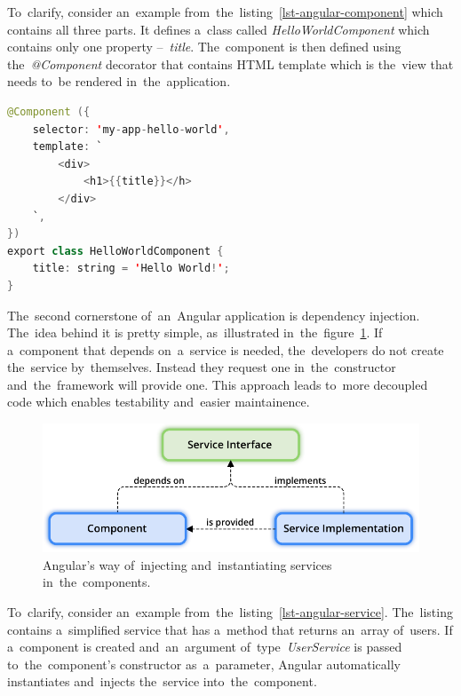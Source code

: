 To~clarify, consider an~example from~the~listing~\ref{lst-angular-component}
which contains all three parts. It defines a~class called
\textit{HelloWorldComponent} which contains only one property --~\textit{title}.
The~component is then defined using the~\textit{@Component} decorator that
contains HTML template which is the~view that needs to~be rendered
in~the~application.

\pagebreak
\begin{lstlisting}[caption=An~Angular class with~the~\textit{@Component}
decorator and~a~HTML template., label=lst-angular-component, style=dp-default,
language=Java]
@Component ({
	selector: 'my-app-hello-world',
	template: `
		<div>
			<h1>{{title}}</h>
		</div>
	`,
})
export class HelloWorldComponent {
	title: string = 'Hello World!';
}
\end{lstlisting}

The~second cornerstone of~an~Angular application is dependency injection.
The~idea behind it is pretty simple, as~illustrated in~the~figure~\ref{fig-dependency-injection}. If a~component that depends on~a~service is
needed, the~developers do not create the~service by~themselves. Instead they
request one in~the~constructor and~the~framework will provide one. This approach
leads to~more decoupled code which enables testability and~easier maintainence.

\begin{figure}[!hbt]
	\centering
	\includegraphics[scale=0.8]{./figures/dependency-injection.pdf}
	\caption{Angular's way of~injecting and~instantiating services
	in~the~components.}
	\label{fig-dependency-injection}
\end{figure}

To~clarify, consider an~example from~the~listing~\ref{lst-angular-service}.
The~listing contains a~simplified service that has a~method that returns
an~array of~users. If a~component is created and~an~argument
of~type~\textit{UserService} is passed to~the~component's constructor
as~a~parameter, Angular automatically instantiates and~injects the~service
into~the~component. 

